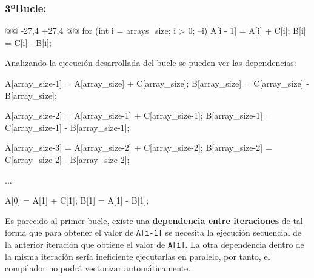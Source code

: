 \subsubsection{\textbf{3ºBucle:}}
\begin{listing}[firstnumber=26]
    @@ -27,4 +27,4 @@
    for (int i = arrays_size; i > 0; --i) {
      A[i - 1] = A[i] + C[i];
      B[i] = C[i] - B[i];
    }
\end{listing}
\par Analizando la ejecución desarrollada del bucle se pueden ver las dependencias:
\newpage
\begin{listing}[numbers=none]
    A[array_size-1] = A[array_size] + C[array_size];
    B[array_size] = C[array_size] - B[array_size];

    A[array_size-2] = A[array_size-1] + C[array_size-1];
    B[array_size-1] = C[array_size-1] - B[array_size-1];

    A[array_size-3] = A[array_size-2] + C[array_size-2];
    B[array_size-2] = C[array_size-2] - B[array_size-2];

                                ...

    A[0] = A[1] + C[1];
    B[1] = A[1] - B[1];
\end{listing}
\par Es parecido al primer bucle, existe una \textbf{dependencia entre iteraciones} de tal forma que para obtener el valor de \texttt{A[i-1]} se necesita
la ejecución secuencial de la anterior iteración que obtiene el valor de \texttt{A[i]}. La otra dependencia dentro de la misma iteración sería
ineficiente ejecutarlas en paralelo, por tanto, el compilador no podrá vectorizar automáticamente.